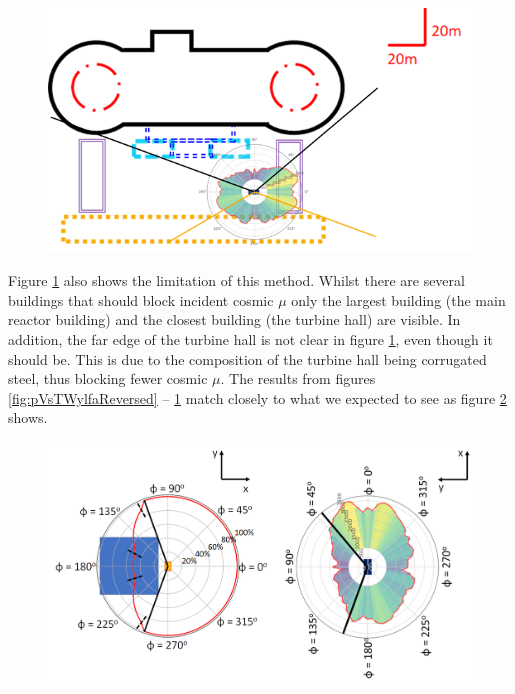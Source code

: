  \begin{figure}[!h]
 \centering
 \includegraphics[width=0.7\linewidth]{Chapter5/Figs/wylfaRasterNew/wylfaCircular0-37.5Deg_Overlay.png}
 \label{fig:wylfaCircular0-37.5Deg_Overlay}
\end{figure}

Figure \ref{fig:wylfaCircular0-37.5Deg_Overlay} also shows the limitation of this method. Whilst there are several buildings that should block incident cosmic $\mu$ only the largest building (the main reactor building) and the closest building (the turbine hall) are visible. In addition, the far edge of the turbine hall is not clear in figure \ref{fig:wylfaCircular0-37.5Deg_Overlay}, even though it should be. This is due to the composition of the turbine hall being corrugated steel, thus blocking fewer cosmic $\mu$. The results from figures \ref{fig:pVsTWylfaReversed} -- \ref{fig:wylfaCircular0-37.5Deg_Overlay} match closely to what we expected to see as figure \ref{fig:sideBySideComparisonTopDownCirc} shows. 

 \begin{figure}[!h]
 \centering
 \includegraphics[width=\linewidth]{Chapter6/Figs/Raster/sideBySideComparisonTopDownCircMedText.png}
 \label{fig:sideBySideComparisonTopDownCirc}
\end{figure}

